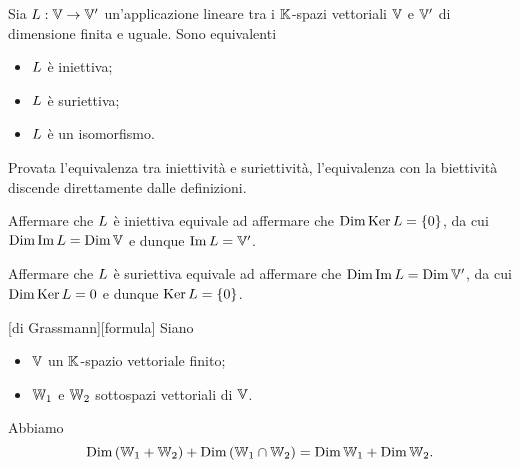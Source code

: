 \begin{Corollary}
	Sia $L: \mathbb{V} \rightarrow \mathbb{V}'$ un'applicazione lineare tra i $\mathbb{K}$-spazi vettoriali $\mathbb{V}$ e $\mathbb{V}'$ di dimensione finita e uguale.
	Sono equivalenti
	\begin{itemize}
		\item $L$ \`e iniettiva;
		\item $L$ \`e suriettiva;
		\item $L$ \`e un isomorfismo.
	\end{itemize}
\end{Corollary}
\Proof Provata l'equivalenza tra iniettivit\`a e suriettivit\`a, l'equivalenza con la biettivit\`a discende direttamente dalle definizioni.
\par Affermare che $L$ \`e iniettiva equivale ad affermare che $\operatorname{\operatorname{Dim}}{\operatorname{Ker}{L}} = \lbrace 0 \rbrace$, da cui $\operatorname{\operatorname{Dim}}{\operatorname{Im}{L}} = \operatorname{\operatorname{Dim}}{\mathbb{V}}$ e dunque $\operatorname{Im}{L} = \mathbb{V}'$.
\par Affermare che $L$ \`e suriettiva equivale ad affermare che $\operatorname{\operatorname{Dim}}{\operatorname{Im}{L}} = \operatorname{\operatorname{Dim}}{\mathbb{V}'}$, da cui $\operatorname{\operatorname{Dim}}{\operatorname{Ker}{L}} = 0$ e dunque $\operatorname{Ker}{L} = \lbrace 0 \rbrace$. \EndProof
\begin{Theorem}
	[di Grassmann][formula] Siano
	\begin{itemize}
		\item $\mathbb{V}$ un $\mathbb{K}$-spazio vettoriale finito;
		\item $\mathbb{W}_1$ e $\mathbb{W}_2$ sottospazi vettoriali di $\mathbb{V}$.
	\end{itemize}
	Abbiamo
	\[
		\operatorname{Dim}{(\mathbb{W}_1 + \mathbb{W}_2)} + \operatorname{Dim}{(\mathbb{W}_1 \cap \mathbb{W}_2)} = \operatorname{Dim}{\mathbb{W}_1} + \operatorname{Dim}{\mathbb{W}_2}.
	\]
\end{Theorem}
